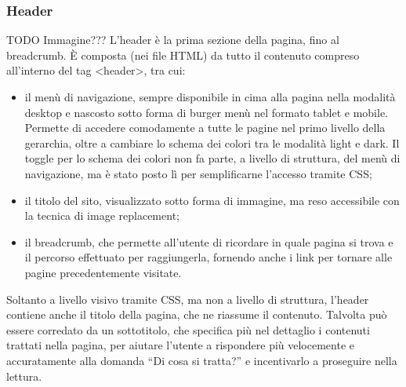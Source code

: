 \documentclass[a4paper]{article}
\begin{document}
	\subsubsection{Header} \label{header}
	TODO Immagine???
	L'header è la prima sezione della pagina, fino al breadcrumb. È composta (nei file HTML) da tutto il contenuto compreso all'interno del tag <header>, tra cui:
	\begin{itemize}
		\item il menù di navigazione, sempre disponibile in cima alla pagina nella modalità desktop e nascosto sotto forma di burger menù nel formato tablet e mobile. Permette di accedere comodamente a tutte le pagine nel primo livello della gerarchia, oltre a cambiare lo schema dei colori tra le modalità light e dark. Il toggle per lo schema dei colori non fa parte, a livello di struttura, del menù di navigazione, ma è stato posto lì per semplificarne l'accesso tramite CSS;
		\item il titolo del sito, visualizzato sotto forma di immagine, ma reso accessibile con la tecnica di image replacement;
		\item il breadcrumb, che permette all'utente di ricordare in quale pagina si trova e il percorso effettuato per raggiungerla, fornendo anche i link per tornare alle pagine precedentemente visitate.
	\end{itemize}
	Soltanto a livello visivo tramite CSS, ma non a livello di struttura, l'header contiene anche il titolo della pagina, che ne riassume il contenuto. Talvolta può essere corredato da un sottotitolo, che specifica più nel dettaglio i contenuti trattati nella pagina, per aiutare l'utente a rispondere più velocemente e accuratamente alla domanda “Di cosa si tratta?” e incentivarlo a proseguire nella lettura.
	
\end{document}
